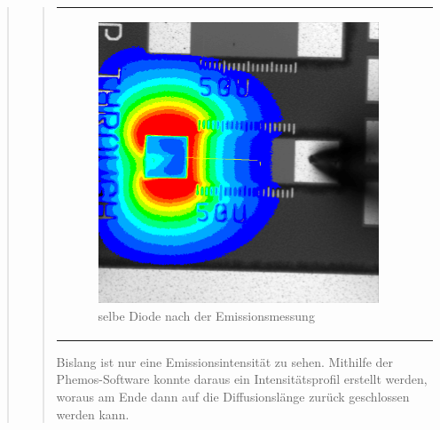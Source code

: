 \begin{quote}
\begin{quote}
\begin{center}
\begin{tabular}{ll}
\begin{minipage}{0.6\textwidth}
                         \begin{figure}[H]
                            \label{fig:iouiouoouio}
                            \includegraphics[scale=0.25, trim = 0cm 0cm 0cm
                            0cm,
                            clip]{./Emissionsbilder/vier/nach_Emission_Distanz.png}
                            \caption{selbe Diode nach der Emissionsmessung}
                        \end{figure}
                   \vspace{-1.5em}

                    \end{minipage}

                \end{tabular}
                \end{center}

        \vspace{2em}

        Bislang ist nur eine Emissionsintensität zu sehen. Mithilfe der
        Phemos-Software konnte daraus ein Intensitätsprofil erstellt werden,
        woraus am Ende dann auf die Diffusionslänge zurück geschlossen werden
        kann.

        \vspace{1.5em}


\end{quote}
\end{quote}
